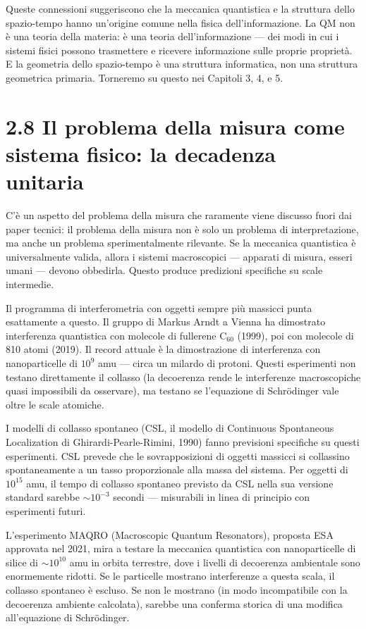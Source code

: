 \documentclass[11.5pt,a4paper,openany]{book}
\theoremstyle{remark}
\begin{document}
Queste connessioni suggeriscono che la meccanica quantistica e la struttura dello spazio-tempo hanno un'origine comune nella fisica dell'informazione. La QM non è una teoria della materia: è una teoria dell'informazione --- dei modi in cui i sistemi fisici possono trasmettere e ricevere informazione sulle proprie proprietà. E la geometria dello spazio-tempo è una struttura informatica, non una struttura geometrica primaria. Torneremo su questo nei Capitoli 3, 4, e 5.

\section{2.8 Il problema della misura come sistema fisico: la decadenza unitaria}

C'è un aspetto del problema della misura che raramente viene discusso fuori dai paper tecnici: il problema della misura non è solo un problema di interpretazione, ma anche un problema sperimentalmente rilevante. Se la meccanica quantistica è universalmente valida, allora i sistemi macroscopici --- apparati di misura, esseri umani --- devono obbedirla. Questo produce predizioni specifiche su scale intermedie.

Il programma di interferometria con oggetti sempre più massicci punta esattamente a questo. Il gruppo di Markus Arndt a Vienna ha dimostrato interferenza quantistica con molecole di fullerene C$_{60}$ (1999), poi con molecole di 810 atomi (2019). Il record attuale è la dimostrazione di interferenza con nanoparticelle di $10^9$ amu --- circa un milardo di protoni. Questi esperimenti non testano direttamente il collasso (la decoerenza rende le interferenze macroscopiche quasi impossibili da osservare), ma testano se l'equazione di Schrödinger vale oltre le scale atomiche.

I modelli di collasso spontaneo (CSL, il modello di Continuous Spontaneous Localization di Ghirardi-Pearle-Rimini, 1990) fanno previsioni specifiche su questi esperimenti. CSL prevede che le sovrapposizioni di oggetti massicci si collassino spontaneamente a un tasso proporzionale alla massa del sistema. Per oggetti di $10^{15}$ amu, il tempo di collasso spontaneo previsto da CSL nella sua versione standard sarebbe $\sim 10^{-3}$ secondi --- misurabili in linea di principio con esperimenti futuri.

L'esperimento MAQRO (Macroscopic Quantum Resonators), proposta ESA approvata nel 2021, mira a testare la meccanica quantistica con nanoparticelle di silice di $\sim 10^{10}$ amu in orbita terrestre, dove i livelli di decoerenza ambientale sono enormemente ridotti. Se le particelle mostrano interferenze a questa scala, il collasso spontaneo è escluso. Se non le mostrano (in modo incompatibile con la decoerenza ambiente calcolata), sarebbe una conferma storica di una modifica all'equazione di Schrödinger.
\end{document}
